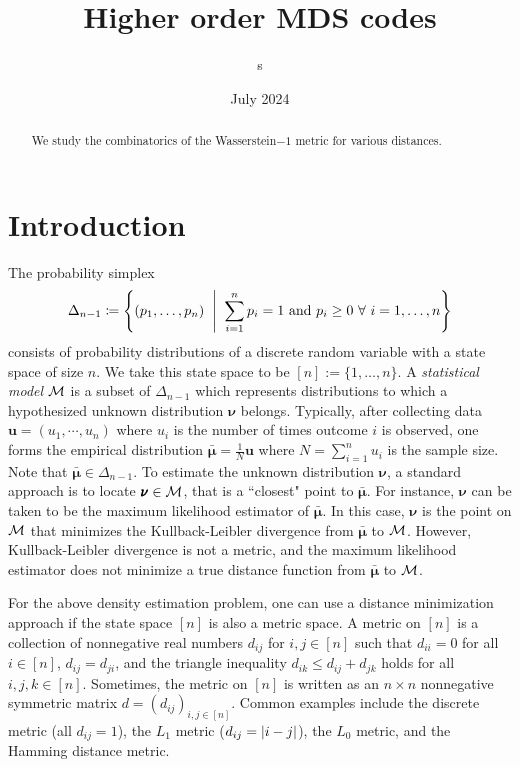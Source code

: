 

\usepackage[
backend=biber,
style=alphabetic,giveninits,
citestyle=ieee-alphabetic,
natbib=true,
uniquelist=false,
maxnames=10,
sorting=ynt
]{biblatex}
%


\title{Higher order MDS codes}
\author{s}
\date{July 2024}



\begin{abstract}
We study the combinatorics of the Wasserstein$-1$ metric for various distances.
\end{abstract}
\maketitle

\section{Introduction}
The probability simplex 
$$ \Delta_{n-1}  \sett \set{(p_1, \ldots, p_n) \st \sum_{i=1}^n p_i = 1 \text{ and } p_i \geq 0 \fa i=1, \ldots,n }$$
consists of probability distributions of a discrete random variable with a state space of size $n$. We  take this state space to be $[n] := \{1, \ldots, n\}$. A {\it statistical model} ${\mathcal{M}}$ is a subset of $\Delta_{n-1}$ which represents distributions to which a hypothesized unknown distribution $\pmb\nu$ belongs. Typically, after collecting data $\pmb u=(u_1, \cdots, u_n)$ where $u_i$ is the number of times outcome $i$ is observed, one forms 
the empirical distribution $\bar{\pmb \mu} = \frac{1}{N} \pmb u$  where $ N = \sum\limits_{i=1}^n u_i$ is the sample size. Note that $\bar{\pmb \mu} \in \Delta_{n-1}$. To estimate the unknown distribution $\pmb \nu$, a standard approach is to locate $\pmb \nu \in {\mathcal{M}}$, that is a ``closest" point to $\bar {\pmb\mu}$. For instance, $\pmb\nu$ can be taken to be the maximum likelihood estimator \cite[Chapter 7]{sullivant2018algstat} of $\bar{\pmb \mu}$. In this case, $\pmb \nu$ is the point on ${\mathcal{M}}$ that minimizes the Kullback-Leibler divergence from $\bar{\pmb \mu}$ to ${\mathcal{M}}$. However, Kullback-Leibler divergence is not a metric, and the maximum likelihood estimator does not minimize a true distance function from $\bar{\pmb\mu}$ to ${\mathcal{M}}$.

For the above density estimation problem, one can use a distance minimization approach if the state space $[n]$ is also a metric space. A metric on $[n]$ is a collection of nonnegative real numbers $d_{ij}$ for $i,j \in [n]$ such that $d_{ii} = 0$ for all $i \in [n]$, $d_{ij} = d_{ji}$, and the triangle inequality $d_{ik} \leq d_{ij} + d_{jk}$ holds for all $i,j,k \in [n]$. Sometimes, the metric on $[n]$ is written as an $n\times n$ nonnegative symmetric matrix $d=(d_{ij})_{i,j\in [n]}$. Common examples include the discrete metric (all $d_{ij}=1$), the $L_1$ metric ($d_{ij} = \left| i-j \right|$), the $L_0$ metric, and the Hamming distance metric.

